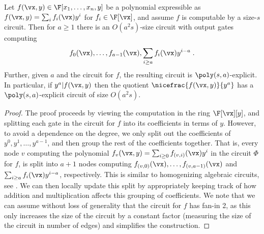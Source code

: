 \documentclass{toc}
\begin{document}
\begin{lemma}\label{res:divide-by-y:white-box}
        Let $f(\vx,y)\in\F[x_1,\ldots,x_n,y]$ be a polynomial expressible as $f(\vx,y)=\sum_i f_i(\vx)y^i$ for $f_i\in\F[\vx]$, and assume $f$ is computable by a size-$s$ circuit. Then for $a\ge 1$ there is an $O(a^2s)$-size circuit with output gates computing
        \[
                f_0(\vx),\ldots,f_{a-1}(\vx),\sum_{i\ge a} f_i(\vx) y^{i-a}
                \;.
        \]
        Further, given $a$ and the circuit for $f$, the resulting circuit is $\poly(s,a)$-explicit.  In particular, if $y^a|f(\vx,y)$ then the quotient $\nicefrac{f(\vx,y)}{y^a}$ has a $\poly(s,a)$-explicit circuit of size $O(a^2s)$.
\end{lemma}
\begin{proof}
        The proof proceeds by viewing the computation in the ring $\F[\vx][y]$, and splitting each gate in the circuit for $f$ into its coefficients in terms of $y$.  However, to avoid a dependence on the degree, we only split out the coefficients of $y^0,y^1,\ldots,y^{a-1}$, and then group the rest of the coefficients together.  That is,  every node $v$ computing the polynomial $f_v(\vx,y)=\sum_{i\ge 0} f_{(v,i)}(\vx)y^i$ in the circuit $\Phi$ for $f$, is split into $a+1$ nodes computing $f_{(v,0)}(\vx),\dots,f_{(v,a-1)}(\vx)$ and $\sum_{i\ge a} f_i(\vx)y^{i-a}$, respectively. This is similar to homogenizing algebraic circuits, see \cite{SY10}.
%
%
%
%
We can then locally update this split by appropriately keeping track of how addition and multiplication affects this grouping of coefficients.  We note that we can assume without loss of generality that the circuit for $f$ has fan-in 2, as this only increases the size of the circuit by a constant factor (measuring the size of the circuit in number of edges) and simplifies the construction.
%


\end{proof}
\end{document}
